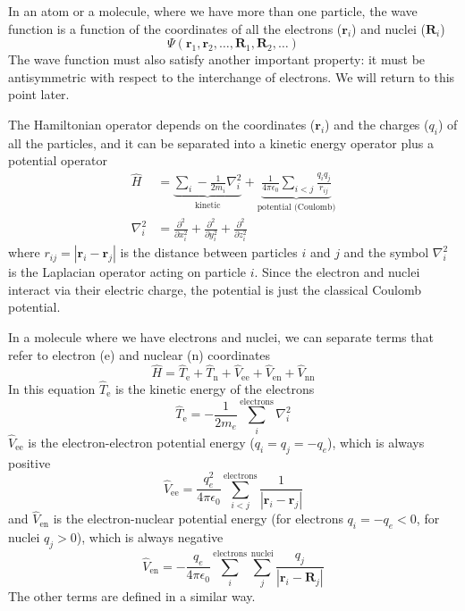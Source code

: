 \documentclass[../Main/notes.tex]{subfiles}
\begin{document}
In an atom or a molecule, where we have more than one particle, the wave function is a function of the coordinates of all the electrons ($\mathbf{r}_i$) and nuclei ($\mathbf{R}_i$)
\begin{equation}
\Psi(\mathbf{r}_1, \mathbf{r}_2, \ldots, \mathbf{R}_1,  \mathbf{R}_2,\ldots)
\end{equation}
The wave function must also satisfy another important property: it must be antisymmetric with respect to the interchange of electrons. We will return to this point later.

The Hamiltonian operator depends on the coordinates ($\mathbf{r}_i$) and the charges ($q_i$) of all the particles, and it can be separated into a kinetic energy operator plus a potential operator
\begin{align}
\hat{H} & =
\underbrace{
\sum_i -\frac{1}{2 m_i} \nabla^2_i
}_{\text{kinetic}}
+
\underbrace{
\frac{1}{4\pi \epsilon_0} \sum_{i < j} \frac{q_i q_j}{r_{ij}}
}_{\text{potential (Coulomb)}}  
\\
\nabla^2_i & = \frac{\partial^2}{\partial x_i^2} +  \frac{\partial^2}{\partial y_i^2} +  \frac{\partial^2}{\partial z_i^2}
\end{align}
where $r_{ij} = |\mathbf{r}_i - \mathbf{r}_j|$ is the distance between particles $i$ and $j$ and the symbol $\nabla^2_i$ is the Laplacian operator acting on particle $i$.
Since the electron and nuclei interact via their electric charge, the potential is just the classical Coulomb potential.


In a molecule where we have electrons and nuclei, we can separate terms that refer to electron (e) and nuclear (n) coordinates
\begin{equation}
\hat{H} = \hat{T}_\mathrm{e} + \hat{T}_\mathrm{n} +  \hat{V}_\mathrm{ee} + \hat{V}_\mathrm{en} + \hat{V}_\mathrm{nn}
\end{equation}
In this equation $\hat{T}_\mathrm{e}$ is the kinetic energy of the electrons
\begin{equation}
\hat{T}_\mathrm{e} = -\frac{1}{2 m_e}  \sum_{i}^{\mathrm{electrons}}\nabla^2_i
\end{equation}
$\hat{V}_\mathrm{ee}$ is the electron-electron potential energy ($q_i = q_j = - q_e$), which is always positive
\begin{equation}
\hat{V}_\mathrm{ee} = \frac{q_e^2}{4\pi \epsilon_0}  \sum_{i < j}^{\mathrm{electrons}} \frac{1}{|\mathbf{r}_{i} - \mathbf{r}_{j}|}
\end{equation}
and $\hat{V}_\mathrm{en}$ is the electron-nuclear potential energy (for electrons $q_i = -q_e < 0$, for nuclei $q_j > 0$), which is always negative
\begin{equation}
\hat{V}_\mathrm{en} = - \frac{q_e}{4\pi \epsilon_0}  \sum_{i}^{\mathrm{electrons}}  \sum_{j}^{\mathrm{nuclei}} \frac{q_j}{|\mathbf{r}_{i} - \mathbf{R}_{j}|}
\end{equation}
The other terms are defined in a similar way.
\end{document}
